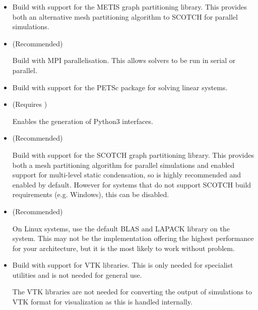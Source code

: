 \begin{itemize}
    \item {}

    Build \nekpp with support for the METIS graph partitioning library. This
    provides both an alternative mesh partitioning algorithm to SCOTCH for
    parallel simulations.

    \item {} (Recommended)

    Build \nekpp with MPI parallelisation. This allows solvers to be run in
    serial or parallel.

    \item {}

    Build \nekpp with support for the PETSc package for solving linear systems.

    \item {} (Requires )

    Enables the generation of Python3 interfaces.

    \item {} (Recommended)

    Build \nekpp with support for the SCOTCH graph partitioning library. This
    provides both a mesh partitioning algorithm for parallel simulations and
    enabled support for multi-level static condensation, so is highly
    recommended and enabled by default. However for systems that do not support
    SCOTCH build requirements (e.g. Windows), this can be disabled.

    \item {} (Recommended)

    On Linux systems, use the default BLAS and LAPACK library on the system.
    This may not be the implementation offering the highest performance for your
    architecture, but it is the most likely to work without problem.

    \item {}

    Build \nekpp with support for VTK libraries. This is only needed for
    specialist utilities and is not needed for general use.

    \begin{notebox}
    The VTK libraries are not needed for converting the output of simulations to
    VTK format for visualization as this is handled internally.
    \end{notebox}
\end{itemize}


